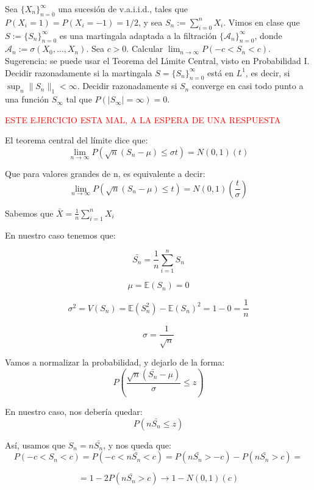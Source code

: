 
\begin{problem}[4]  Sea $\{X_n\}_{n=0}^{\infty}$ una sucesi\'on de v.a.i.i.d., tales que 
$P(X_i = 1)= P(X_i = -1) = 1/2$, y sea $S_n := \sum_{i=0}^n X_i$.
Vimos en clase que $S := \{S_n\}_{n=0}^{\infty}$  es una martingala adaptada a la filtraci\'on
$\{\mathcal{A}_n\}_{n=0}^{\infty}$, donde $\mathcal{A}_n := \sigma(X_0, \dots, X_n)$.
Sea $c > 0$. 
Calcular $\lim_{n\to \infty} P( -c < S_n < c)$. Sugerencia: se puede usar el Teorema del L\'{\i}mite Central,
visto en Probabilidad I.
 Decidir razonadamente si la martingala $S = \{S_n\}_{n=0}^{\infty}$ 
 est\'a en $L^1$, es decir, si $\sup_n \|S_n\|_1 < \infty$. Decidir razonadamente
si $S_n$ converge en casi todo punto a una funci\'on $S_ \infty$ tal que
$P(|S_\infty| = \infty) = 0$. 

\solution
\textcolor{red}{ESTE EJERCICIO ESTA MAL, A LA ESPERA DE UNA RESPUESTA}

\begin{expla}
El teorema central del límite dice que:
\[
\lim_{n \rightarrow \infty} P(\sqrt{n}(S_n - \mu) \leq \sigma t) = N(0,1)(t)
\]

Que para valores grandes de n, es equivalente a decir:
\[
\lim_{n \rightarrow \infty} P(\sqrt{n}(S_n - \mu) \leq t) = N(0,1)(\frac{t}{\sigma})
\]

Sabemos que $\bar{X} = \frac{1}{n} \sum_{i=1}^{n}X_i$

\end{expla}

En nuestro caso tenemos que:

\[
\bar{S_n} = \frac{1}{n} \sum_{i=1}^{n}S_n
\]

\[
\mu = \mathbb{E}(S_n)= 0
\]

\[
\sigma^2 = V(S_n) = \mathbb{E}(S_n^2)-\mathbb{E}(S_n)^2 = 1 - 0 = \frac{1}{n} 
\]

\[
\sigma = \frac{1}{\sqrt{n}}
\]


Vamos a normalizar la probabilidad, y dejarlo de la forma:
\[
P(\frac{\sqrt{n}(\bar{S_n}-\mu)}{\sigma} \leq z)
\]

En nuestro caso, nos debería quedar:
\[
P(n\bar{S_n}\leq z)
\]


Así, usamos que $S_n = n\bar{S_n}$, y nos queda que:
\[
P(-c<S_n<c)=P(-c<n\bar{S_n}<c)=P(n\bar{S_n}>-c)-P(n\bar{S_n}>c)=
\]

\[
=1-2P(n\bar{S_n}>c) \rightarrow 1-N(0,1)(c)
\]



\end{problem}

